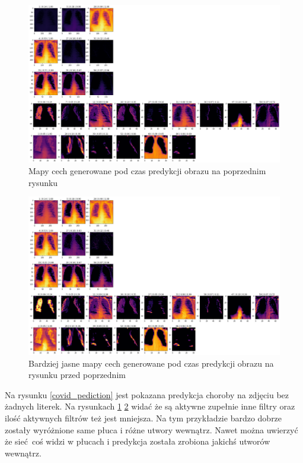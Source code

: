 \documentclass{article}
\begin{document}
\begin{figure}[H]
	\centering
	\includegraphics[width=1\textwidth,keepaspectratio=true]{covid_filters_dark}
	\caption{Mapy cech generowane pod czas predykcji obrazu na poprzednim rysunku}
	\label{covid_filters_dark}
\end{figure}

\begin{figure}[H]
	\centering
	\includegraphics[width=1\textwidth,keepaspectratio=true]{covid_filters_light}
	\caption{Bardziej jasne mapy cech generowane pod czas predykcji obrazu na rysunku przed poprzednim}
	\label{covid_filters_light}
\end{figure}


Na rysunku \ref{covid_pediction} jest pokazana predykcja choroby na zdjęciu bez żadnych literek. Na rysunkach \ref{covid_filters_dark} \ref{covid_filters_light} widać że są aktywne zupełnie inne filtry oraz ilość aktywnych filtrów też jest mniejsza. Na tym przykładzie bardzo dobrze zostały wyróżnione same płuca i różne utwory wewnątrz. Nawet można uwierzyć że sieć coś widzi w płucach i predykcja została zrobiona jakichś utworów wewnątrz. 
\end{document}
